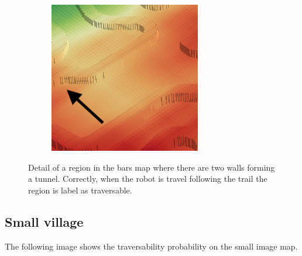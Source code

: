 \documentclass[../document.tex]{subfiles}
\begin{document}
\begin{figure} [htbp]
\begin{subfigure}[b]{0.23\textwidth}
  \end{subfigure}
  \begin{subfigure}[b]{0.23\textwidth}
      \includegraphics[width=\linewidth]{../img/4/traversability/bars/tunnel/-180-crop.png}  
  \end{subfigure}
  \caption{Detail of a region in the bars map where there are two walls forming a tunnel. Correctly, when the robot is travel following the trail the region is label as traversable.}
  \end{figure}

\subsection{Small village}
The following image shows the traversability probability on the small image map.
\end{document}
